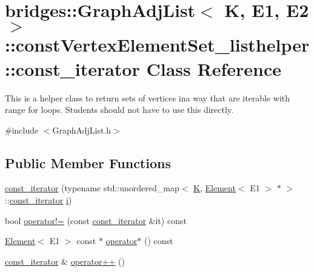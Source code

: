 \hypertarget{classbridges_1_1_graph_adj_list_1_1const_vertex_element_set__listhelper_1_1const__iterator}{}\section{bridges\+:\+:Graph\+Adj\+List$<$ K, E1, E2 $>$\+:\+:const\+Vertex\+Element\+Set\+\_\+listhelper\+:\+:const\+\_\+iterator Class Reference}
\label{classbridges_1_1_graph_adj_list_1_1const_vertex_element_set__listhelper_1_1const__iterator}


This is a helper class to return sets of vertices ina way that are iterable with range for loops. Students should not have to use this directly.  




{\ttfamily \#include $<$Graph\+Adj\+List.\+h$>$}

\subsection*{Public Member Functions}
\begin{DoxyCompactItemize}
\item 
\hyperlink{classbridges_1_1_graph_adj_list_1_1const_vertex_element_set__listhelper_1_1const__iterator_a5b0e97db3f9ce1a92600ab27634dfb25}{const\+\_\+iterator} (typename std\+::unordered\+\_\+map$<$ \hyperlink{namespacebridges_acfb0a4f7877d8f63de3e6862004c50edaa5f3c6a11b03839d46af9fb43c97c188}{K}, \hyperlink{classbridges_1_1_element}{Element}$<$ E1 $>$ $\ast$ $>$\+::\hyperlink{classbridges_1_1_graph_adj_list_1_1const_vertex_element_set__listhelper_1_1const__iterator}{const\+\_\+iterator} \hyperlink{namespacebridges_acfb0a4f7877d8f63de3e6862004c50eda865c0c0b4ab0e063e5caa3387c1a8741}{i})
\item 
bool \hyperlink{classbridges_1_1_graph_adj_list_1_1const_vertex_element_set__listhelper_1_1const__iterator_abf8be34e9256e09beb06980163182cc0}{operator!=} (const \hyperlink{classbridges_1_1_graph_adj_list_1_1const_vertex_element_set__listhelper_1_1const__iterator}{const\+\_\+iterator} \&it) const
\item 
\hyperlink{classbridges_1_1_element}{Element}$<$ E1 $>$ const  $\ast$ \hyperlink{classbridges_1_1_graph_adj_list_1_1const_vertex_element_set__listhelper_1_1const__iterator_ab23af890f4bbd74195c67c0d9ec2969c}{operator$\ast$} () const
\item 
\hyperlink{classbridges_1_1_graph_adj_list_1_1const_vertex_element_set__listhelper_1_1const__iterator}{const\+\_\+iterator} \& \hyperlink{classbridges_1_1_graph_adj_list_1_1const_vertex_element_set__listhelper_1_1const__iterator_a3c654115a3c563a3a8b3b4613bddd763}{operator++} ()
\end{DoxyCompactItemize}


